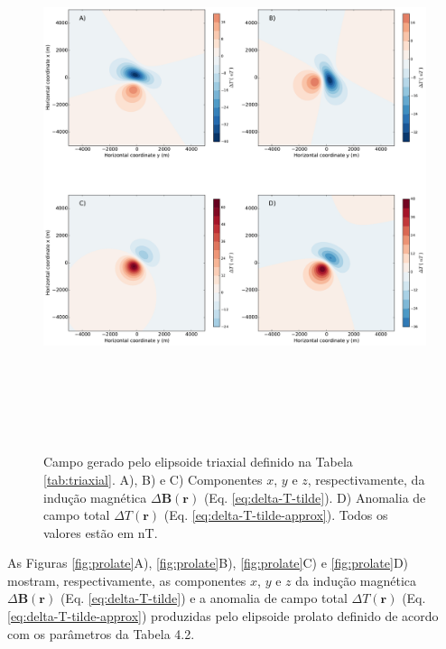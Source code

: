 \begin{figure}[hbt!]
	\centering \includegraphics[width=16cm,height=16cm]{figures/ellipsoid_triaxial}
	\caption[Campo gerado pelo elipsoide triaxial definido na Tabela \ref{tab:triaxial}. A), B) e C) Componentes $x$, $y$ e $z$, respectivamente, da indução magnética $\Delta \mathbf{B}(\mathbf{r})$ (Eq. \ref{eq:delta-T-tilde}). D) Anomalia de campo total $\Delta T (\mathbf{r})$ (Eq. \ref{eq:delta-T-tilde-approx}). Todos os valores estão em nT.]{Campo gerado pelo elipsoide triaxial definido na Tabela \ref{tab:triaxial}. A), B) e C) Componentes $x$, $y$ e $z$, respectivamente, da indução magnética $\Delta \mathbf{B}(\mathbf{r})$ (Eq. \ref{eq:delta-T-tilde}). D) Anomalia de campo total $\Delta T (\mathbf{r})$ (Eq. \ref{eq:delta-T-tilde-approx}). Todos os valores estão em nT.}
	\label{fig:triaxial}
\end{figure}

As Figuras \ref{fig:prolate}A), \ref{fig:prolate}B), \ref{fig:prolate}C) e \ref{fig:prolate}D) mostram, respectivamente, as componentes $x$, $y$ e $z$ da indução magnética $\Delta \mathbf{B}(\mathbf{r})$ (Eq. \ref{eq:delta-T-tilde}) e a
anomalia de campo total $\Delta T (\mathbf{r})$ (Eq. \ref{eq:delta-T-tilde-approx}) produzidas pelo elipsoide prolato definido de acordo com os parâmetros da Tabela 4.2.

